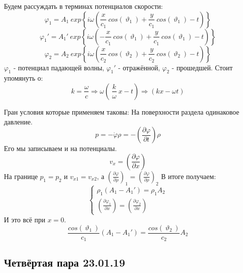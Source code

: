 \documentclass[14pt,a4paper,oneside]{extarticle}	%
\newcommand{\bracket}[1] {\left( #1 \right) } %
\newcommand{\dif}[2] {\bracket{ \frac{\partial #1}{\partial #2} }}
\begin{document}
Будем рассуждать в терминах потенциалов скорости:
\begin{equation*}
\varphi_{1} = A_{1}\: exp\left\lbrace i\omega\bracket{\frac{x}{c_{1}}\:cos(\:\vartheta_{1}\:) + \frac{y}{c_{1}}\:cos(\:\vartheta_{1}\:) -t} \right\rbrace  
\end{equation*} 
\begin{equation*}
\varphi_{1}' = A_{1}'\: exp\left\lbrace i\omega\bracket{-\frac{x}{c_{1}}\:cos(\:\vartheta_{1}\:) + \frac{y}{c_{1}}\:cos(\:\vartheta_{1}\:) -t} \right\rbrace  
\end{equation*} 
\begin{equation*}
\varphi_{2} = A_{2}\: exp\left\lbrace i\omega\bracket{\frac{x}{c_{2}}\:cos(\:\vartheta_{2}\:) + \frac{y}{c_{2}}\:cos(\:\vartheta_{2}\:) -t} \right\rbrace  
\end{equation*} 
$ \varphi_{1} $ - потенциал падающей волны, $ \varphi_{1}' $ - отражённой, $ \varphi_{2} $ - прошедшей.
Стоит упомянуть о:
\begin{equation*}
k = \frac{\omega}{c} \Rightarrow \omega (\:\frac{k}{\omega}\:x - t) \Rightarrow (kx - \omega t)
\end{equation*} 

Гран условия которые применяем таковы:
На поверхности раздела одинаковое давление.
\begin{equation*}
p = -\dot{\varphi}\rho = -\dif{\varphi}{t}\rho
\end{equation*} 
Его мы записываем и на потенциалы.
\begin{equation*}
v_{x} = \dif{\varphi}{x}
\end{equation*} 
На границе $ p_{1} = p_{2} $ и $ v_{x1} = v_{x2} $, а $ \dif{\varphi}\rho_{1} = \dif{\varphi}\rho_{2} $
В итоге получаем:
\begin{equation*}
 \begin{cases}
\rho_{1}\bracket{A_{1}-A_{1}'} = \rho_{1} A_{2} \\
\dif{\varphi_{1}}{x} = \dif{\varphi_{2}}{x}
\end{cases}
\end{equation*} 
И это всё при $ x = 0 $.
\begin{equation*}
\frac{cos(\:\vartheta_{1}\:)}{c_{1}}\bracket{A_{1}-A_{1}'}= \frac{cos(\:\vartheta_{2}\:)}{c_{2}}A_{2}
\end{equation*}

\newpage

\begin{center}
	\section*{Четвёртая пара 23.01.19} %
\end{center}
\end{document}
